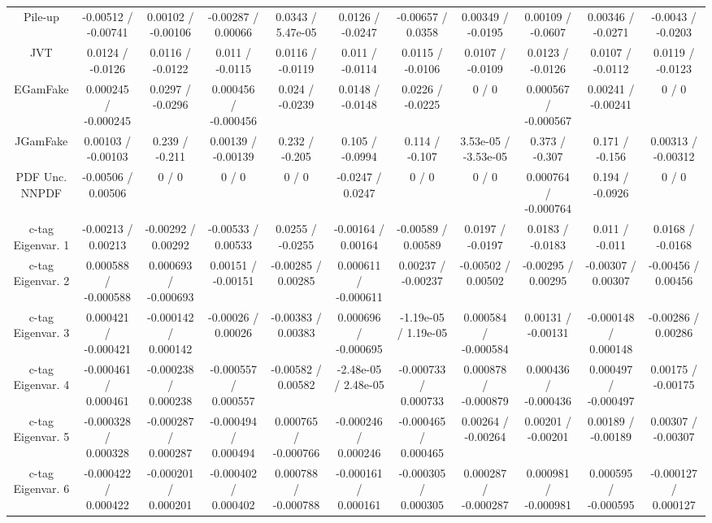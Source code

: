 \begin{table}[htbp]
\begin{center}
\begin{tabular}{|c|c|c|c|c|c|c|c|c|c|c|}
  Pile-up & -0.00512 / -0.00741 & 0.00102 / -0.00106 & -0.00287 / 0.00066 & 0.0343 / 5.47e-05 & 0.0126 / -0.0247 & -0.00657 / 0.0358 & 0.00349 / -0.0195 & 0.00109 / -0.0607 & 0.00346 / -0.0271 & -0.0043 / -0.0203 \\ 
  JVT & 0.0124 / -0.0126 & 0.0116 / -0.0122 & 0.011 / -0.0115 & 0.0116 / -0.0119 & 0.011 / -0.0114 & 0.0115 / -0.0106 & 0.0107 / -0.0109 & 0.0123 / -0.0126 & 0.0107 / -0.0112 & 0.0119 / -0.0123 \\ 
  EGamFake & 0.000245 / -0.000245 & 0.0297 / -0.0296 & 0.000456 / -0.000456 & 0.024 / -0.0239 & 0.0148 / -0.0148 & 0.0226 / -0.0225 & 0 / 0 & 0.000567 / -0.000567 & 0.00241 / -0.00241 & 0 / 0 \\ 
  JGamFake & 0.00103 / -0.00103 & 0.239 / -0.211 & 0.00139 / -0.00139 & 0.232 / -0.205 & 0.105 / -0.0994 & 0.114 / -0.107 & 3.53e-05 / -3.53e-05 & 0.373 / -0.307 & 0.171 / -0.156 & 0.00313 / -0.00312 \\ 
  PDF Unc. NNPDF & -0.00506 / 0.00506 & 0 / 0 & 0 / 0 & 0 / 0 & -0.0247 / 0.0247 & 0 / 0 & 0 / 0 & 0.000764 / -0.000764 & 0.194 / -0.0926 & 0 / 0 \\ 
  c-tag Eigenvar. 1 & -0.00213 / 0.00213 & -0.00292 / 0.00292 & -0.00533 / 0.00533 & 0.0255 / -0.0255 & -0.00164 / 0.00164 & -0.00589 / 0.00589 & 0.0197 / -0.0197 & 0.0183 / -0.0183 & 0.011 / -0.011 & 0.0168 / -0.0168 \\ 
  c-tag Eigenvar. 2 & 0.000588 / -0.000588 & 0.000693 / -0.000693 & 0.00151 / -0.00151 & -0.00285 / 0.00285 & 0.000611 / -0.000611 & 0.00237 / -0.00237 & -0.00502 / 0.00502 & -0.00295 / 0.00295 & -0.00307 / 0.00307 & -0.00456 / 0.00456 \\ 
  c-tag Eigenvar. 3 & 0.000421 / -0.000421 & -0.000142 / 0.000142 & -0.00026 / 0.00026 & -0.00383 / 0.00383 & 0.000696 / -0.000695 & -1.19e-05 / 1.19e-05 & 0.000584 / -0.000584 & 0.00131 / -0.00131 & -0.000148 / 0.000148 & -0.00286 / 0.00286 \\ 
  c-tag Eigenvar. 4 & -0.000461 / 0.000461 & -0.000238 / 0.000238 & -0.000557 / 0.000557 & -0.00582 / 0.00582 & -2.48e-05 / 2.48e-05 & -0.000733 / 0.000733 & 0.000878 / -0.000879 & 0.000436 / -0.000436 & 0.000497 / -0.000497 & 0.00175 / -0.00175 \\ 
  c-tag Eigenvar. 5 & -0.000328 / 0.000328 & -0.000287 / 0.000287 & -0.000494 / 0.000494 & 0.000765 / -0.000766 & -0.000246 / 0.000246 & -0.000465 / 0.000465 & 0.00264 / -0.00264 & 0.00201 / -0.00201 & 0.00189 / -0.00189 & 0.00307 / -0.00307 \\ 
  c-tag Eigenvar. 6 & -0.000422 / 0.000422 & -0.000201 / 0.000201 & -0.000402 / 0.000402 & 0.000788 / -0.000788 & -0.000161 / 0.000161 & -0.000305 / 0.000305 & 0.000287 / -0.000287 & 0.000981 / -0.000981 & 0.000595 / -0.000595 & -0.000127 / 0.000127 \\ 

\end{tabular}
\end{center}
\end{table}
